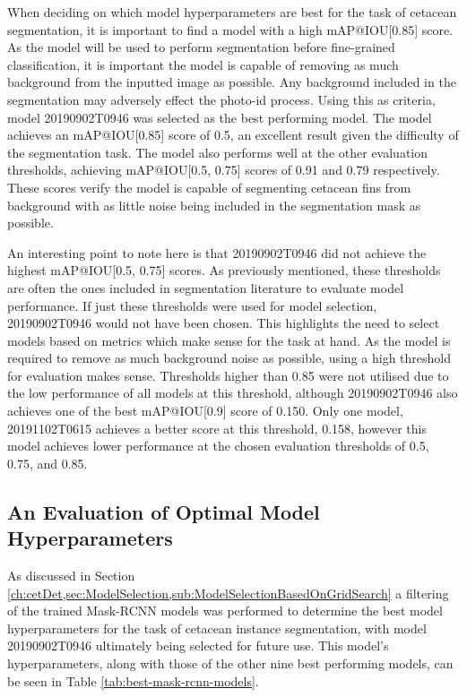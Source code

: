 When deciding on which model hyperparameters are best for the task of cetacean segmentation, it is important to find a model with a high mAP@IOU[0.85] score. As the model will be used to perform segmentation before fine-grained classification, it is important the model is capable of removing as much background from the inputted image as possible. Any background included in the segmentation may adversely effect the photo-id process. Using this as criteria, model 20190902T0946 was selected as the best performing model. The model achieves an mAP@IOU[0.85] score of 0.5, an excellent result given the difficulty of the segmentation task. The model also performs well at the other evaluation thresholds, achieving mAP@IOU[0.5, 0.75] scores of 0.91 and 0.79 respectively. These scores verify the model is capable of segmenting cetacean fins from background with as little noise being included in the segmentation mask as possible.

An interesting point to note here is that 20190902T0946 did not achieve the highest mAP@IOU[0.5, 0.75] scores. As previously mentioned, these thresholds are often the ones included in segmentation literature to evaluate model performance. If just these thresholds were used for model selection, 20190902T0946 would not have been chosen. This highlights the need to select models based on metrics which make sense for the task at hand. As the model is required to remove as much background noise as possible, using a high threshold for evaluation makes sense. Thresholds higher than 0.85 were not utilised due to the low performance of all models at this threshold, although 20190902T0946 also achieves one of the best mAP@IOU[0.9] score of 0.150. Only one model, 20191102T0615 achieves a better score at this threshold, 0.158, however this model achieves lower performance at the chosen evaluation thresholds of 0.5, 0.75, and 0.85.

\subsection{An Evaluation of Optimal Model Hyperparameters}\label{ch:cetDet,sec:ModelSelection,sub:OptimalHyperparameters}

As discussed in Section \ref{ch:cetDet,sec:ModelSelection,sub:ModelSelectionBasedOnGridSearch} a filtering of the trained Mask-RCNN models was performed to determine the best model hyperparameters for the task of cetacean instance segmentation, with model 20190902T0946 ultimately being selected for future use. This model's hyperparameters, along with those of the other nine best performing models, can be seen in Table \ref{tab:best-mask-rcnn-models}.

